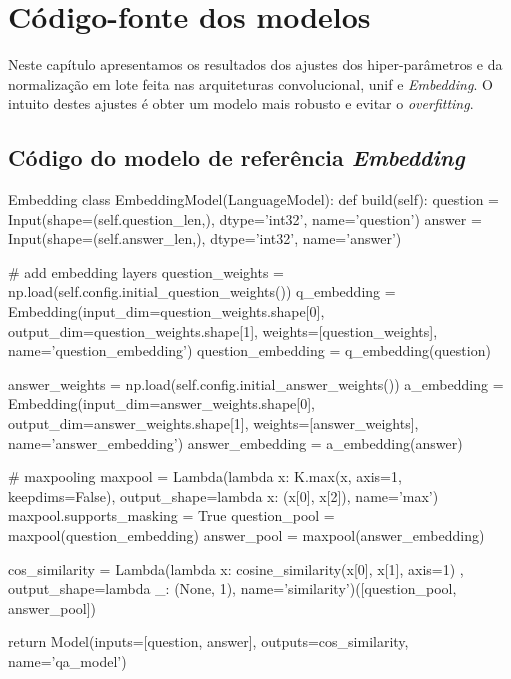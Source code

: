 \chapter{Código-fonte dos modelos}
\label{ape:codigo-fonte-dos-modelos}

Neste capítulo apresentamos os resultados dos ajustes dos hiper-parâmetros e da normalização em lote feita nas arquiteturas convolucional, \Gls{unif} e \textit{Embedding}. O intuito destes ajustes é obter um modelo mais robusto e evitar o \textit{overfitting}.

\section{Código do modelo de referência \textit{Embedding}}
\label{sec:codigo-modelo-embedding}

\begin{mypython-linenumber}{Embedding}
class EmbeddingModel(LanguageModel):
    def build(self):
        question = Input(shape=(self.question_len,), dtype='int32', name='question')
        answer = Input(shape=(self.answer_len,), dtype='int32', name='answer')

        # add embedding layers
        question_weights = np.load(self.config.initial_question_weights())
        q_embedding = Embedding(input_dim=question_weights.shape[0],
                                output_dim=question_weights.shape[1],
                                weights=[question_weights],
                                name='question_embedding')
        question_embedding = q_embedding(question)

        answer_weights = np.load(self.config.initial_answer_weights())
        a_embedding = Embedding(input_dim=answer_weights.shape[0],
                                output_dim=answer_weights.shape[1],
                                weights=[answer_weights],
                                name='answer_embedding')
        answer_embedding = a_embedding(answer)

        # maxpooling
        maxpool = Lambda(lambda x: K.max(x, axis=1, keepdims=False), output_shape=lambda x: (x[0], x[2]),
                         name='max')
        maxpool.supports_masking = True
        question_pool = maxpool(question_embedding)
        answer_pool = maxpool(answer_embedding)
        
        cos_similarity = Lambda(lambda x: cosine_similarity(x[0], x[1], axis=1)
                                       , output_shape=lambda _: (None, 1), name='similarity')([question_pool,
                                                                                               answer_pool])

        return Model(inputs=[question, answer], outputs=cos_similarity,
                                   name='qa_model')

\end{mypython-linenumber}


